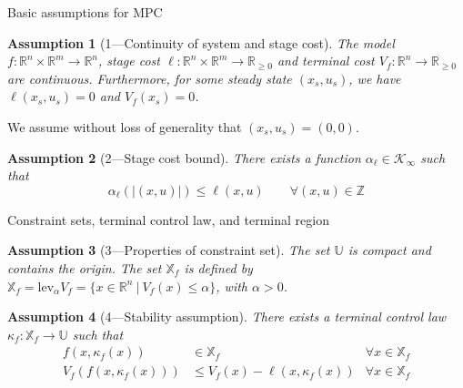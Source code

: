 \documentclass{beamer}
\newtheorem{assumption}{Assumption}
\newcommand{\abs}[1]{\left\lvert #1 \right\rvert}
\begin{document}
\begin{frame}{Basic assumptions for MPC}
\begin{assumption}[1---Continuity of system and stage cost]
\label{as:continuity}
The model $f:\mathbb{R}^n \times \mathbb{R}^m \rightarrow \mathbb{R}^n$, 
stage cost $\ell: \mathbb{R}^n \times \mathbb{R}^m \rightarrow \mathbb{R}_
{\geq 0}$ and terminal cost $V_f:\mathbb{R}^n \rightarrow \mathbb{R}_{\geq 0}$
are continuous. Furthermore, for some steady state $(x_s,u_s)$, we have $\ell(x_s,u_s)=0$
and $V_f(x_s) = 0$.
\end{assumption}
We assume without loss of generality that 
$(x_s,u_s) = (0,0)$.
\begin{assumption}[2---Stage cost bound]
\label{as:pdstagecost}
There exists a function $\alpha_\ell \in \mathcal{K}_\infty$ such that
\begin{equation*}
\alpha_\ell(\abs{(x,u)}) \leq \ell(x,u) \qquad \forall (x,u) \in \mathbb{Z}
\end{equation*}
\end{assumption}
\end{frame}



\begin{frame}{Constraint sets, terminal control law, and terminal region}
\begin{assumption}[3---Properties of constraint set]
\label{as:constraints}
The set $\mathbb{U}$ is compact and contains the origin. 
The set $\mathbb{X}_f$ is defined by  $\mathbb{X}_f= \text{lev}_\alpha V_f = \{x \in \mathbb{R}^n \ | \ 
V_f(x) \leq \alpha\}$, with $\alpha > 0$.
\end{assumption}

\begin{assumption}[4---Stability assumption]
\label{as:terminalstability}
There exists a terminal control law $\kappa_f:\mathbb{X}_f \rightarrow
\mathbb{U}$ such that
\begin{align*}
f(x,\kappa_f(x)) &\in \mathbb{X}_f \qquad &\forall x \in \mathbb{X}_f\\
V_f(f(x,\kappa_f(x))) &\leq V_f(x)-\ell(x,\kappa_f(x))  
&\forall x \in \mathbb{X}_f
\end{align*}
\end{assumption}

\end{frame}
\end{document}
